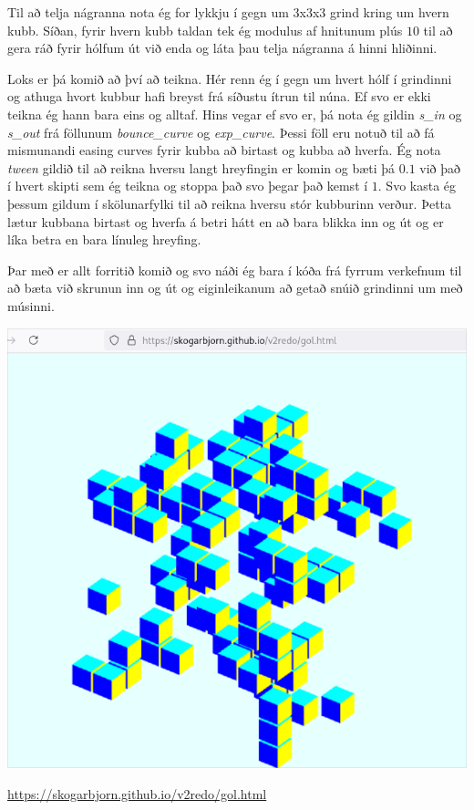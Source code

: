 \documentclass{article}
\begin{document}
	Til að telja nágranna nota ég for lykkju í gegn um 3x3x3 grind kring um 
	hvern kubb. Síðan, fyrir hvern kubb taldan tek ég modulus af hnitunum 
	plús $10$ til að gera ráð fyrir hólfum út við enda og láta þau telja 
	nágranna á hinni hliðinni.

	Loks er þá komið að því að teikna. Hér renn ég í gegn um hvert hólf
	í grindinni og athuga hvort kubbur hafi breyst frá síðustu ítrun til 
	núna. Ef svo er ekki teikna ég hann bara eins og alltaf. Hins vegar ef 
	svo er, þá nota ég gildin \textit{s\_in} og \textit{s\_out} frá 
	föllunum \textit{bounce\_curve} og \textit{exp\_curve}. Þessi föll eru 
	notuð til að fá mismunandi easing curves fyrir kubba að birtast og 
	kubba að hverfa. Ég nota \textit{tween} gildið til að reikna hversu 
	langt hreyfingin er komin og bæti þá $0.1$ við það í hvert skipti sem 
	ég teikna og stoppa það svo þegar það kemst í $1$. Svo kasta ég þessum 
	gildum í skölunarfylki til að reikna hversu stór kubburinn verður. Þetta 
	lætur kubbana birtast og hverfa á betri hátt en að bara blikka inn og út 
	og er líka betra en bara línuleg hreyfing.

	Þar með er allt forritið komið og svo náði ég bara í kóða frá fyrrum 
	verkefnum til að bæta við skrunun inn og út og eiginleikanum að getað 
	snúið grindinni um með músinni.

	\vspace{2em}
	\begin{center}
		\includegraphics[scale=0.45]{demo.png}

		\url{https://skogarbjorn.github.io/v2redo/gol.html}
	\end{center}
\end{document}
